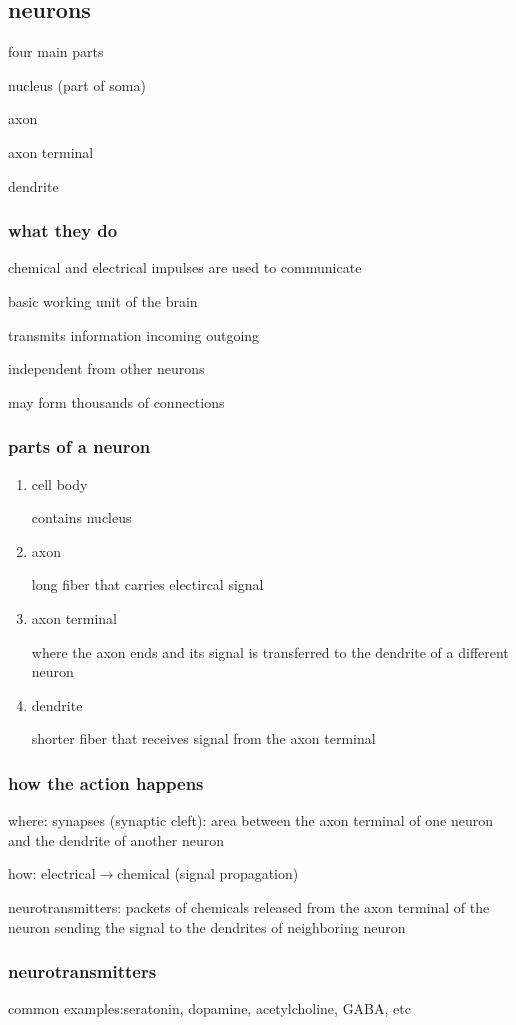 \documentclass[letterpaper]{article}
\begin{document}
\subsection*{neurons}
four main parts

nucleus (part of soma)

axon

axon terminal

dendrite


\subsubsection*{what they do}
chemical and electrical impulses are used to communicate

basic working unit of the brain

transmits information incoming outgoing

independent from other neurons

may  form thousands of connections
\subsubsection*{parts of a neuron}
\begin{enumerate}
\item
cell body

contains nucleus
\item
axon

long fiber that carries electircal signal
\item
axon terminal

where the axon ends and its signal is transferred to the dendrite of a different neuron
\item
dendrite

shorter fiber that receives signal from the axon terminal
\end{enumerate}
\subsubsection*{how the action happens}
where: synapses (synaptic cleft): area between the axon terminal of one neuron and the dendrite of another neuron

how: electrical$\rightarrow$chemical (signal propagation)

neurotransmitters: packets of chemicals released from the axon terminal of the neuron sending the signal to the dendrites of neighboring neuron

\subsubsection*{neurotransmitters}
common examples:seratonin, dopamine, acetylcholine, GABA, etc
\end{document}
